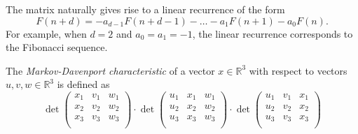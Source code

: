 The matrix naturally gives rise to a linear recurrence of the form
\[
  F(n + d) = -a_{d-1} F(n + d - 1) - \dots - a_1 F(n + 1) - a_0 F(n).
\]
For example, when $d = 2$ and $a_0 = a_1 = -1$, the linear recurrence
corresponds to the Fibonacci sequence.

\begin{definition}
  The \emph{Markov-Davenport characteristic} of a vector $x ∈ ℝ^3$ with respect to vectors $u, v, w ∈ ℝ^3$
  is defined as
  \[
    \det
    \begin{pmatrix}
      x_1 & v_1 & w_1 \\
      x_2 & v_2 & w_2 \\
      x_3 & v_3 & w_3 \\
    \end{pmatrix}
    · \det
    \begin{pmatrix}
      u_1 & x_1 & w_1 \\
      u_2 & x_2 & w_2 \\
      u_3 & x_3 & w_3 \\
    \end{pmatrix}
    · \det
    \begin{pmatrix}
      u_1 & v_1 & x_1 \\
      u_2 & v_2 & x_2 \\
      u_3 & v_3 & x_3 \\
    \end{pmatrix}
  \]
\end{definition}
